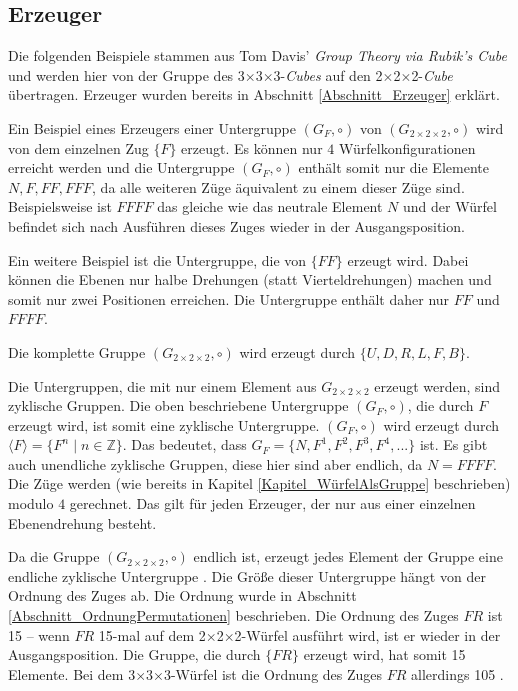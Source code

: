 \documentclass[12pt,a4paper, usenames, dvipsnames]{article}
\theoremstyle{mystyle}
\theoremstyle{definition}
\newcommand{\Gtwo}{\ensuremath{G_{2\times 2\times 2}}}
\newcommand{\Ttwo}{2$\times$2$\times$2-}
\newcommand{\Tthree}{3$\times$3$\times$3-}
\begin{document}
%
%
%
%
%
%
%
%
%
%
%
%
%
%
%
%
%
%
%
%

\subsection{Erzeuger}

Die folgenden Beispiele stammen aus Tom Davis' \textit{Group Theory via Rubik's Cube} \cite{TD} und werden hier von der Gruppe des \Tthree \textit{Cubes} auf den \Ttwo \textit{Cube} übertragen. Erzeuger wurden bereits in Abschnitt \ref{Abschnitt_Erzeuger} erklärt.


Ein Beispiel eines Erzeugers einer Untergruppe $(G_F, \circ)$ von $(\Gtwo, \circ)$ wird von dem einzelnen Zug $\{ F \}$ erzeugt. Es können nur $4$ Würfelkonfigurationen erreicht werden und die Untergruppe $(G_F, \circ)$ enthält somit nur die Elemente ${N, F, FF, FFF}$, da alle weiteren Züge äquivalent zu einem dieser Züge sind. Beispielsweise ist $FFFF$ das gleiche wie das neutrale Element $N$ und der Würfel befindet sich nach Ausführen dieses Zuges wieder in der Ausgangsposition.


Ein weitere Beispiel ist die Untergruppe, die von $\{FF\}$ erzeugt wird. Dabei können die Ebenen nur halbe Drehungen (statt Vierteldrehungen) machen und somit nur zwei Positionen erreichen. Die Untergruppe enthält daher nur $FF$ und $FFFF$.


Die komplette Gruppe $(\Gtwo, \circ)$ wird erzeugt durch $\{U, D, R, L, F, B\}$.

Die Untergruppen, die mit nur einem Element aus $\Gtwo$ erzeugt werden, sind zyklische Gruppen. Die oben beschriebene Untergruppe $(G_F, \circ)$, die durch $ F $ erzeugt wird, ist somit eine zyklische Untergruppe.
$(G_F, \circ)$ wird erzeugt durch $\langle F \rangle = \{ F^n \mid n \in \mathbb{Z}\}$. Das bedeutet, dass $G_F = \{N, F^1, F^2, F^3, F^4, ...\}$ ist. Es gibt auch unendliche zyklische Gruppen, diese hier sind aber endlich, da $N = FFFF$. Die Züge werden (wie bereits in Kapitel \ref{Kapitel_WürfelAlsGruppe} beschrieben) modulo $4$ gerechnet.
Das gilt für jeden Erzeuger, der nur aus einer einzelnen Ebenendrehung besteht.


Da die Gruppe $(\Gtwo, \circ)$ endlich ist, erzeugt jedes Element der Gruppe eine endliche zyklische Untergruppe \cite{TD}. Die Größe dieser Untergruppe hängt von der Ordnung des Zuges ab. Die Ordnung wurde in Abschnitt \ref{Abschnitt_OrdnungPermutationen} beschrieben.
Die Ordnung des Zuges $FR$ ist 15 -- wenn $FR$ 15-mal auf dem \Ttwo Würfel ausführt wird, ist er wieder in der Ausgangsposition. 
Die Gruppe, die durch $\{FR\}$ erzeugt wird, hat somit 15 Elemente. Bei dem \Tthree Würfel ist die Ordnung des Zuges $FR$ allerdings 105 \cite{TD}.
%
%
%
%
%
%
%
%
%
%
%
%
%
%
%
%
%
%
%
\end{document}
